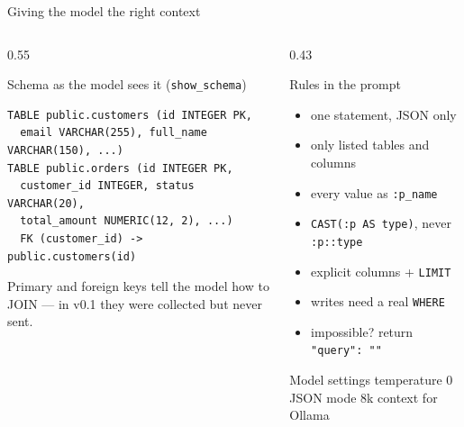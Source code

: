 \documentclass[aspectratio=169,10pt]{beamer}
\begin{document}
\begin{frame}[fragile]{Giving the model the right context}
  \begin{columns}[T]
    \begin{column}{0.55\textwidth}
      \begin{block}{\footnotesize Schema as the model sees it (\texttt{show\_schema})}
\begin{lstlisting}
TABLE public.customers (id INTEGER PK,
  email VARCHAR(255), full_name VARCHAR(150), ...)
TABLE public.orders (id INTEGER PK,
  customer_id INTEGER, status VARCHAR(20),
  total_amount NUMERIC(12, 2), ...)
  FK (customer_id) -> public.customers(id)
\end{lstlisting}
      \end{block}
      \footnotesize Primary and foreign keys tell the model how to JOIN ---
      in v0.1 they were collected but never sent.
    \end{column}
    \begin{column}{0.43\textwidth}
      \begin{block}{\footnotesize Rules in the prompt}
        \scriptsize
        \begin{itemize}
          \item one statement, JSON only
          \item only listed tables and columns
          \item every value as \texttt{:p\_name}
          \item \texttt{CAST(:p AS type)}, never \texttt{:p::type}
          \item explicit columns + \texttt{LIMIT}
          \item writes need a real \texttt{WHERE}
          \item impossible? return \texttt{"query": ""}
        \end{itemize}
      \end{block}
      \begin{block}{\footnotesize Model settings}
        \scriptsize temperature 0 \textperiodcentered{} JSON mode \textperiodcentered{}
        8k context for Ollama
      \end{block}
    \end{column}
  \end{columns}
\end{frame}
\end{document}
